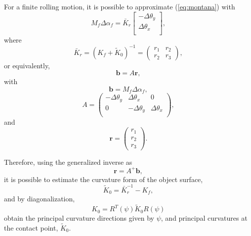 For a finite rolling motion, it is possible to approximate (\ref{eq:montana}) with
\begin{equation}
M_f \Delta{\alpha}_f=\bar{K}_r
\left[
\begin{array}{c}
-\Delta\theta_y\\
\Delta\theta_x\\
\end{array}
\right],
\label{montanaapprox}
\end{equation}
where
\begin{equation}
\bar{K}_r=(K_f+\tilde{K}_0)^{-1}=
\left(
\begin{array}{cc}
r_1 & r_2 \\
r_2 & r_3
\end{array}
\right),
\end{equation}
or equivalently,
\begin{equation}
    \bm{b}=A\bm{r},
\end{equation}
with
\begin{equation}
    \bm{b}=M_f \Delta{\alpha}_f,
\end{equation}
\begin{equation}
A=\left(
\begin{array}{ccc}
-\Delta\theta_y & \Delta\theta_x & 0\\
0 & -\Delta\theta_y & \Delta\theta_x\\
\end{array}
\right),
\end{equation}
and
\begin{equation}
\bm{r}=\left(
\begin{array}{c}
r_1\\
r_2\\
r_3
\end{array}
\right).
\end{equation}

Therefore, using the generalized inverse as
\begin{equation}
\bm{r}=A^+\bm{b},
\end{equation}
it is possible to estimate the curvature form of the object surface,
\begin{equation}
\tilde{K}_0=\bar{K}_r^{-1}-K_f,
\end{equation}
and by diagonalization,
\begin{equation}
K_0=R^T(\psi)\tilde{K}_0 R(\psi)
\end{equation}
obtain the principal curvature directions given by $\psi$, and principal curvatures at the contact point, $\tilde{K}_0$.

